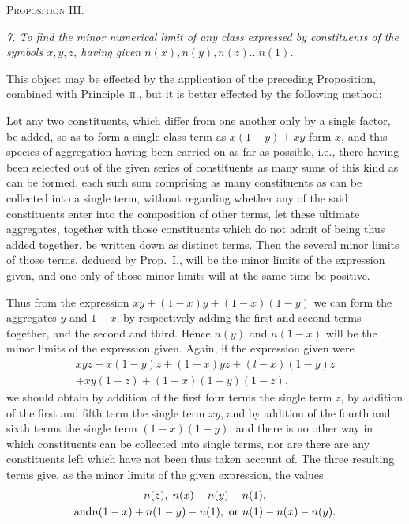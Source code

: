 \documentclass[oneside]{book}
\begin{document}
\begin{center}
\textsc{Proposition III.}
\end{center}

\emph{7. To find the minor numerical limit of any class expressed by
constituents of the symbols $x, y, z$, having given
$n(x), n(y), n(z) \dotsc n(1)$.}

This object may be effected by the application of the preceding
Proposition, combined with Principle~\textsc{ii.}, but it is better
effected by the following method:

Let any two constituents, which differ from one another only
by a single factor, be added, so as to form a single class term
as $x(1 - y) + xy$ form $x$, and this species of aggregation having
been carried on as far as possible, i.e., there having been selected
out of the given series of constituents as many sums of this kind
as can be formed, each such sum comprising as many constituents
as can be collected into a single term, without regarding whether
any of the said constituents enter into the composition of other
terms, let these ultimate aggregates, together with those constituents
which do not admit of being thus added together, be
written down as distinct terms. Then the several minor limits
of those terms, deduced by Prop.~I., will be the minor limits of
the expression given, and one only of those minor limits will at
the same time be positive.

Thus from the expression $xy + (1 - x)y + (1 - x)(1 - y)$ we
can form the aggregates $y$ and $1 - x$, by respectively adding the
first and second terms together, and the second and third.
Hence $n(y)$ and $n(1 - x)$ will be the minor limits of the expression
given. Again, if the expression given were
\begin{multline*}
xyz + x (1-y) z + (1-x) yz + (l-x) (1-y) z\\
 + xy(1-z) +(1-x)(1-y)(1-z),
\end{multline*}
we should obtain by addition of the first four terms the single
term $z$, by addition of the first and fifth term the single term $xy$,
and by addition of the fourth and sixth terms the single term
$(1-x) (1-y)$; and there is no other way in which constituents
can be collected into single terms, nor are there are any constituents
left which have not been thus taken account of. The
three resulting terms give, as the minor limits of the given
expression, the values
\begin{gather*}
n(z),\; n(x) + n(y) - n(1),\\
\text{and}\hfill
 n(1-x) + n(1-y) - n(1), \text{ or } n(1) - n(x) - n(y). \hfill
\end{gather*}
\end{document}
